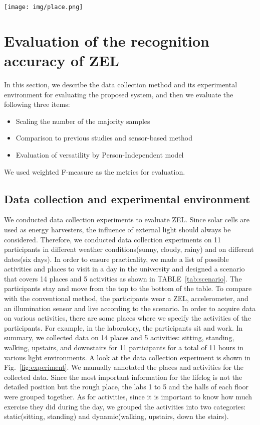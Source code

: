 \documentclass[conference]{IEEEtran}
\begin{document}
\begin{figure*}[t]
    \centering
    \texttt{[image: img/place.png]}
    \caption{A look at the data collection experiment}
    \label{fig:experiment}
\end{figure*}

\section{Evaluation of the recognition accuracy of ZEL} \label{sec:eval_accuracy}
In this section, we describe the data collection method and its experimental environment for evaluating the proposed system, and then we evaluate the following three items:
\begin{itemize}
    \item Scaling the number of the majority samples
    \item Comparison to previous studies and sensor-based method
    \item Evaluation of versatility by Person-Independent model
\end{itemize}
We used weighted F-measure as the metrics for evaluation.

\subsection{Data collection and experimental environment}
We conducted data collection experiments to evaluate ZEL.
Since solar cells are used as energy harvesters, the influence of external light should always be considered.
Therefore, we conducted data collection experiments on 11 participants in different weather conditions(sunny, cloudy, rainy) and on different dates(six days).
In order to ensure practicality, we made a list of possible activities and places to visit in a day in the university and designed a scenario that covers 14 places and 5 activities as shown in TABLE~\ref{tab:scenario}.
The participants stay and move from the top to the bottom of the table.
To compare with the conventional method, the participants wear a ZEL, accelerometer, and an illumination sensor and live according to the scenario.
In order to acquire data on various activities, there are some places where we specify the activities of the participants.
For example, in the laboratory, the participants sit and work.
In summary, we collected data on 14 places and 5 activities: sitting, standing, walking, upstairs, and downstairs for 11 participants for a total of 11 hours in various light environments.
A look at the data collection experiment is shown in Fig.~\ref{fig:experiment}.
We manually annotated the places and activities for the collected data.
Since the most important information for the lifelog is not the detailed position but the rough place, the labs 1 to 5 and the halls of each floor were grouped together.
As for activities, since it is important to know how much exercise they did during the day, we grouped the activities into two categories: static(sitting, standing) and dynamic(walking, upstairs, down the stairs).
\end{document}
